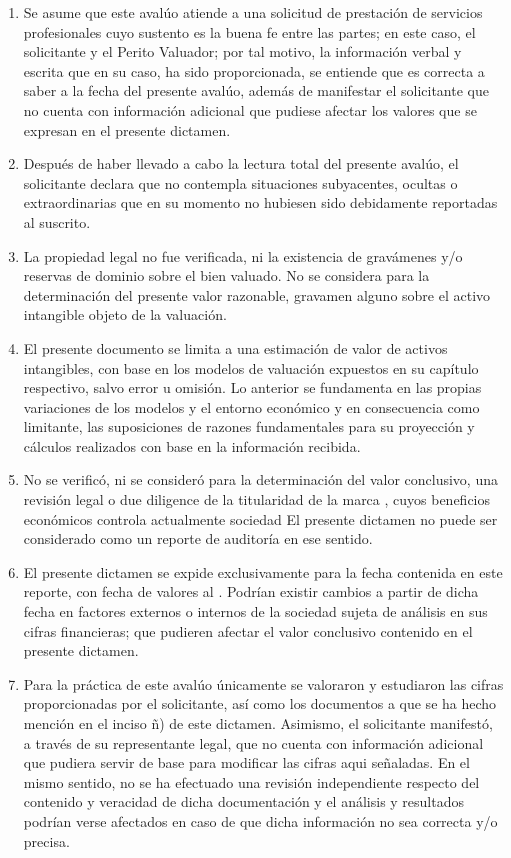 \begin{enumerate}[\indent a)]
\item Se asume que este aval\'uo atiende a una solicitud de prestaci\'on de servicios profesionales cuyo sustento es la buena fe entre las partes; en este caso, el solicitante y el Perito Valuador; por tal motivo, la informaci\'on verbal y escrita que en su caso, ha sido proporcionada, se entiende que es correcta a saber a la fecha del presente aval\'uo, adem\'as de manifestar el solicitante que no cuenta con informaci\'on adicional  que pudiese afectar los valores que se expresan en el presente dictamen.
\item Despu\'es de haber llevado a cabo la lectura total del presente aval\'uo, el solicitante declara que no contempla situaciones subyacentes, ocultas o extraordinarias que en su momento no hubiesen sido debidamente reportadas al suscrito.
\item La propiedad legal no fue verificada, ni la existencia de grav\'amenes y/o reservas de dominio sobre el bien valuado. No se considera para la determinaci\'on del presente valor razonable, gravamen alguno sobre el activo intangible objeto de la valuaci\'on.
\item El presente documento se limita a una estimaci\'on de valor de activos intangibles, con base en los modelos de valuaci\'on expuestos en su cap\'itulo respectivo, salvo error u omisi\'on. Lo anterior se fundamenta en las propias variaciones de los modelos y el entorno econ\'omico y en consecuencia como limitante, las suposiciones de razones fundamentales para su proyecci\'on y c\'alculos realizados con base en la informaci\'on recibida.
\item No se verific\'o, ni se consider\'o para la determinaci\'on del valor conclusivo, una revisi\'on legal o due diligence de la titularidad de la marca \textcolor{principal}{\empresaCorto}, cuyos beneficios econ\'omicos controla actualmente sociedad \textcolor{principal}{\empresaSolicitante}{} El presente dictamen no puede ser considerado como un reporte de auditor\'ia en ese sentido. 
\item El presente dictamen se expide exclusivamente para la fecha contenida en este reporte, con fecha de valores  al \textcolor{principal}{\fechaValores}. Podr\'ian existir cambios a partir de dicha fecha en factores externos o internos de la sociedad sujeta de an\'alisis en sus cifras financieras; que pudieren afectar el valor conclusivo contenido en el presente dictamen.
\item Para la pr\'actica de este aval\'uo \'unicamente se valoraron y estudiaron las cifras proporcionadas por el solicitante, as\'i como los documentos a que se ha hecho menci\'on en el inciso \~n) de este dictamen. Asimismo, el solicitante manifest\'o, a trav\'es de su representante legal, que no cuenta con informaci\'on adicional que pudiera servir de base para modificar las cifras aqui se\~naladas. En el mismo sentido, no se ha efectuado una revisi\'on independiente respecto del contenido y veracidad de dicha documentaci\'on y el an\'alisis y resultados podr\'ian verse afectados en caso de que dicha informaci\'on no sea correcta y/o precisa.


\end{enumerate}
